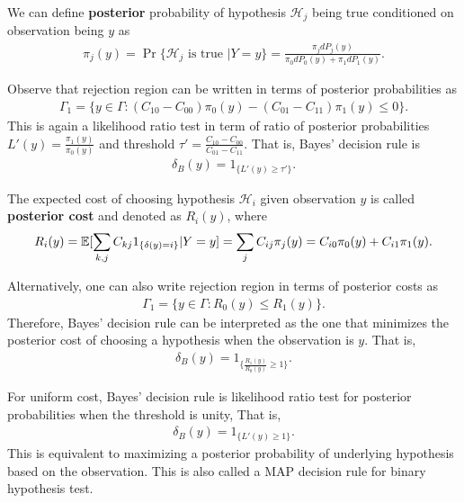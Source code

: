 \documentclass[a4paper,english,12pt]{article}
\begin{document}
\begin{defn} We can define \textbf{posterior} probability of hypothesis $\mathcal{H}_j$ being true conditioned on observation being $y$ as
\begin{align*} 
\pi_j(y) = \Pr\{ \mathcal{H}_j \text{ is true } | Y = y \} = \frac{\pi_j dP_j(y)}{\pi_0dP_0(y) + \pi_1dP_1(y)}.
\end{align*}
\end{defn}
\begin{rem}
Observe that rejection region can be written in terms of posterior probabilities as
\begin{align*}
\Gamma_1 = \{ y \in \Gamma: (C_{10}-C_{00})\pi_0(y) - (C_{01}-C_{11})\pi_1(y) \leq 0 \}.
\end{align*}
This is again a likelihood ratio test in term of ratio of posterior probabilities $L'(y) = \frac{\pi_1(y)}{\pi_0(y)}$ and threshold $\tau' = \frac{C_{10}-C_{00}}{C_{01}-C_{11}}$. That is, Bayes' decision rule is
\begin{align*}
\delta_B(y) = 1_{\{ L'(y) \geq \tau'\}}.
\end{align*}
\end{rem}
\begin{defn}
The expected cost of choosing hypothesis $\mathcal{H}_i$ given observation $y$ is called \textbf{posterior cost} and denoted as $R_i(y)$, where %
\begin{align*}
R_i(y) = \mathbb{E}[\sum_{k,j}C_{kj}1_{\{\delta(y)=i\}}|Y = y] = \sum_{j}C_{ij}\pi_j(y) = C_{i0}\pi_0(y) + C_{i1}\pi_1(y).
\end{align*}
\end{defn}
\begin{rem}
Alternatively, one can also write rejection region in terms of posterior costs as 
\begin{align*}
\Gamma_1 =  \{ y \in \Gamma: R_0(y) \leq R_1(y)\}.
\end{align*}
 Therefore, Bayes' decision rule can be interpreted as the one that minimizes the posterior cost of choosing a hypothesis when the observation is $y$. 
 That is, 
\begin{align*}
\delta_B(y) = 1_{\{ \frac{R_1(y)}{R_0(y)} \geq 1 \}}.
\end{align*}
\end{rem}
\begin{rem}
For uniform cost, Bayes' decision rule is likelihood ratio test for posterior probabilities when the threshold is unity, That is,
\begin{align*}
\delta_B(y) = 1_{\{ L'(y) \geq 1 \}}.
\end{align*}
This is equivalent to maximizing a posterior probability of underlying hypothesis based on the observation. This is also called a MAP decision rule for binary hypothesis test.
\end{rem}
\end{document}
